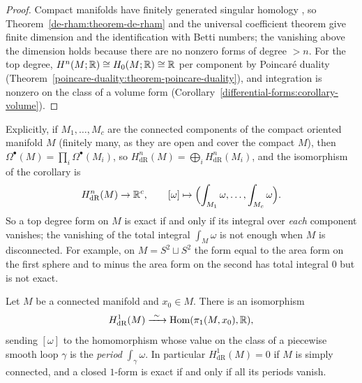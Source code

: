 \begin{proof}
Compact manifolds have finitely generated singular homology \cite[Appendix]{hatcher-at}, so Theorem~\ref{de-rham:theorem-de-rham} and the universal coefficient theorem give finite dimension and the
identification with Betti numbers; the vanishing above the dimension holds because there are no nonzero forms of degree $> n$. For the top degree, $H^n(M; \mathbb{R}) \cong H_0(M; \mathbb{R}) \cong \mathbb{R}$ per component by
Poincar\'e duality (Theorem~\ref{poincare-duality:theorem-poincare-duality}), and integration is nonzero on the class of a volume form
(Corollary~\ref{differential-forms:corollary-volume}).
\end{proof}

Explicitly, if $M_1, \ldots, M_c$ are the connected components of the compact oriented manifold $M$ (finitely many, as they are open and cover the compact $M$), then
$\Omega^\bullet(M) = \prod_i\Omega^\bullet(M_i)$, so $H^n_{\mathrm{dR}}(M) = \bigoplus_iH^n_{\mathrm{dR}}(M_i)$, and the isomorphism of the corollary is
\[
H^n_{\mathrm{dR}}(M) \to \mathbb{R}^c, \qquad [\omega] \mapsto \Bigl(\int_{M_1}\omega, \ldots, \int_{M_c}\omega\Bigr).
\]
So a top degree form on $M$ is exact if and only if its integral over \emph{each} component vanishes; the vanishing of the total integral $\int_M\omega$ is not enough when
$M$ is disconnected. For example, on $M = S^2 \sqcup S^2$ the form equal to the area form on the first sphere and to minus the area form on the second has total integral $0$ but is
not exact.

\begin{proposition}\label{de-rham:proposition-periods}
Let $M$ be a connected manifold and $x_0 \in M$. There is an isomorphism
\[
H^1_{\mathrm{dR}}(M) \xrightarrow{\ \sim\ } \operatorname{Hom}(\pi_1(M, x_0), \mathbb{R}),
\]
sending $[\omega]$ to the homomorphism whose value on the class of a piecewise smooth loop $\gamma$ is the \emph{period} $\int_\gamma\omega$. In particular $H^1_{\mathrm{dR}}(M) = 0$ if $M$ is simply connected, and a closed
$1$-form is exact if and only if all its periods vanish.
\end{proposition}

